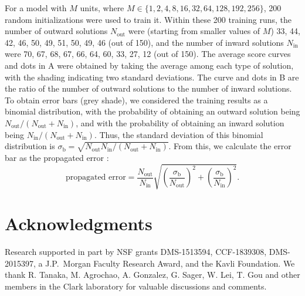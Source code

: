 \documentclass[pdftex,9pt,lineno]{elife}
\begin{document}
For a model with $M$ units, where $M \in \{1,2,4,8,16,32,64,128,192,256\}$, 200 random initializations were used to train it. Within these 200 training runs, the number of outward solutions $N_{\text{out}}$ were (starting from smaller values of $M$) 33, 44, 42, 46, 50, 49, 51, 50, 49, 46 (out of 150), and the number of inward solutions $N_{\text{in}}$ were 70, 67, 68, 67, 66, 64, 60, 33, 27, 12 (out of 150). The average score curves and dots in A were obtained by taking the average among each type of solution, with the shading indicating two standard deviations. The curve and dots in B are the ratio of the number of outward solutions to the number of inward solutions. To obtain error bars (grey shade), we considered the training results as a binomial distribution, with the probability of obtaining an outward solution being $N_{\text{out}}/(N_{\text{out}}+N_{\text{in}})$, and with the probability 
of obtaining an inward 
solution being $N_{\text{in}}/(N_{\text{out}}+N_{\text{in}})$. Thus, the standard deviation of this binomial distribution is $\sigma_{\text{b}}=\sqrt{N_{\text{out}}N_{\text{in}}/(N_{\text{out}}+N_{\text{in}})}$.  From this, we calculate the error bar as the propagated error \citep{caldwell2015propagation}:
\begin{equation}
\text{propagated error} = \frac{N_{\text{out}}}{N_{\text{in}}}\sqrt{\left(\frac{\sigma_{\text{b}}}{N_{\text{out}}}\right)^{2}+\left(\frac{\sigma_{\text{b}}}{N_{\text{in}}}\right)^{2}}.
\end{equation}

\section{Acknowledgments}

Research supported in part by NSF grants DMS-1513594, CCF-1839308, DMS-2015397, a  J.P.~Morgan Faculty Research Award, and the Kavli Foundation. We thank R. Tanaka, M. Agrochao, A. Gonzalez, G. Sager, W. Lei, T. Gou and other members in the Clark laboratory for valuable discussions and comments.


\end{document}
